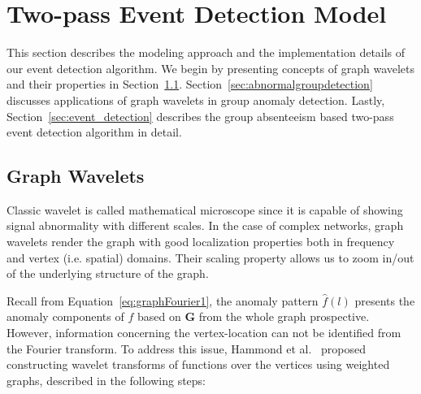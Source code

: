 \section{Two-pass Event Detection Model} \label{sec:algorithm}
This section describes the modeling approach and the implementation details of our event detection algorithm.
We begin by presenting concepts of graph wavelets and their properties in Section~\ref{sec:graph_wavelet}.
Section~\ref{sec:abnormalgroupdetection} discusses applications of graph wavelets in group anomaly detection. Lastly, Section~\ref{sec:event_detection} describes the group absenteeism based two-pass event detection algorithm in detail.
\subsection{Graph Wavelets}
\label{sec:graph_wavelet}
Classic wavelet is called mathematical microscope since it is capable of showing signal abnormality with different scales.
In the case of complex networks, graph wavelets render the graph with good localization properties both in frequency and vertex (i.e. spatial) domains. Their scaling property allows us to zoom in/out of the underlying structure of the graph.


Recall from Equation~\ref{eq:graphFourier1}, the anomaly pattern $\hat{f}(l)$ presents the anomaly components of $f$ based on $\mathbf{G}$ from the whole graph prospective. However, information concerning the vertex-location can not be identified from the Fourier transform. To address this issue, Hammond et al.~\cite{hammond2011wavelets} proposed constructing wavelet transforms of functions over the vertices using weighted graphs, described in the following steps:

